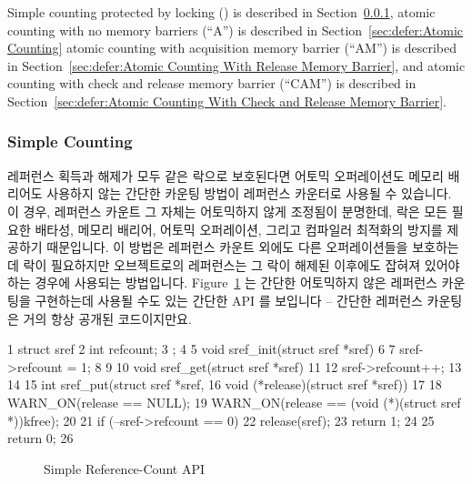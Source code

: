 Simple counting protected by locking () is described in
Section~\ref{sec:defer:Simple Counting},
atomic counting with no memory barriers (``A'') is described in
Section~\ref{sec:defer:Atomic Counting}
atomic counting with acquisition memory barrier (``AM'') is described in
Section~\ref{sec:defer:Atomic Counting With Release Memory Barrier},
and
atomic counting with check and release memory barrier (``CAM'') is described in
Section~\ref{sec:defer:Atomic Counting With Check and Release Memory Barrier}.
\fi

\subsubsection{Simple Counting}
\label{sec:defer:Simple Counting}

레퍼런스 획득과 해제가 모두 같은 락으로 보호된다면 어토믹 오퍼레이션도 메모리
배리어도 사용하지 않는 간단한 카운팅 방법이 레퍼런스 카운터로 사용될 수
있습니다.
이 경우, 레퍼런스 카운트 그 자체는 어토믹하지 않게 조정됨이 분명한데, 락은 모든
필요한 배타성, 메모리 배리어, 어토믹 오퍼레이션, 그리고 컴파일러 최적화의
방지를 제공하기 때문입니다.
이 방법은 레퍼런스 카운트 외에도 다른 오퍼레이션들을 보호하는데 락이 필요하지만
오브젝트로의 레퍼런스는 그 락이 해제된 이후에도 잡혀져 있어야 하는 경우에
사용되는 방법입니다.
Figure~\ref{fig:defer:Simple Reference-Count API} 는 간단한 어토믹하지 않은
레퍼런스 카운팅을 구현하는데 사용될 수도 있는 간단한 API 를 보입니다 -- 간단한
레퍼런스 카운팅은 거의 항상 공개된 코드이지만요.

{ \scriptsize
\begin{verbbox}
  1 struct sref {
  2   int refcount;
  3 };
  4
  5 void sref_init(struct sref *sref)
  6 {
  7   sref->refcount = 1;
  8 }
  9
 10 void sref_get(struct sref *sref)
 11 {
 12   sref->refcount++;
 13 }
 14
 15 int sref_put(struct sref *sref,
 16              void (*release)(struct sref *sref))
 17 {
 18   WARN_ON(release == NULL);
 19   WARN_ON(release == (void (*)(struct sref *))kfree);
 20
 21   if (--sref->refcount == 0) {
 22     release(sref);
 23     return 1;
 24   }
 25   return 0;
 26 }
\end{verbbox}
}
\begin{figure}[htbp]
\centering
\theverbbox
\caption{Simple Reference-Count API}
\label{fig:defer:Simple Reference-Count API}
\end{figure}

